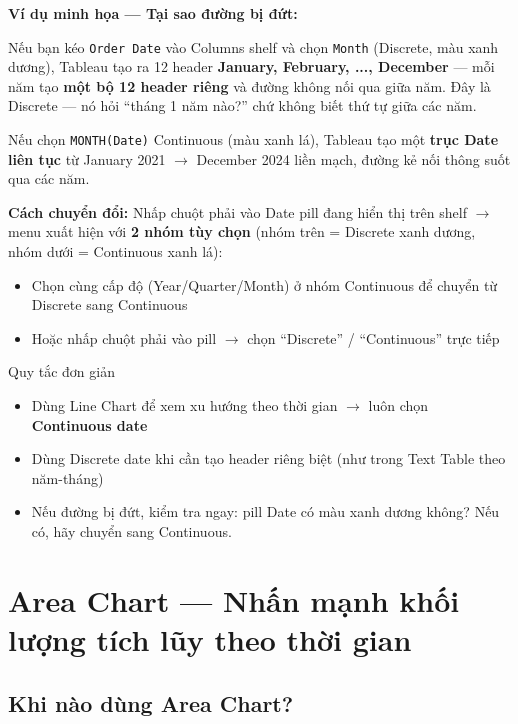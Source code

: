 \documentclass[12pt]{article}
\begin{document}
\noindent \textbf{Ví dụ minh họa --- Tại sao đường bị đứt:}

\noindent Nếu bạn kéo \texttt{Order Date} vào Columns shelf và chọn \texttt{Month} (Discrete, màu xanh dương), Tableau tạo ra 12 header \textbf{January, February, ..., December} --- mỗi năm tạo \textbf{một bộ 12 header riêng} và đường không nối qua giữa năm. Đây là Discrete --- nó hỏi ``tháng 1 năm nào?'' chứ không biết thứ tự giữa các năm.

\noindent Nếu chọn \texttt{MONTH(Date)} Continuous (màu xanh lá), Tableau tạo một \textbf{trục Date liên tục} từ January 2021 $\rightarrow$ December 2024 liền mạch, đường kẻ nối thông suốt qua các năm.

\noindent \textbf{Cách chuyển đổi:} Nhấp chuột phải vào Date pill đang hiển thị trên shelf $\rightarrow$ menu xuất hiện với \textbf{2 nhóm tùy chọn} (nhóm trên = Discrete xanh dương, nhóm dưới = Continuous xanh lá):
\begin{itemize}[nosep]
    \item Chọn cùng cấp độ (Year/Quarter/Month) ở nhóm Continuous để chuyển từ Discrete sang Continuous
    \item Hoặc nhấp chuột phải vào pill $\rightarrow$ chọn ``Discrete'' / ``Continuous'' trực tiếp
\end{itemize}

\begin{warningbox}{Quy tắc đơn giản}
\begin{itemize}[nosep]
    \item Dùng Line Chart để xem xu hướng theo thời gian $\rightarrow$ luôn chọn \textbf{Continuous date}
    \item Dùng Discrete date khi cần tạo header riêng biệt (như trong Text Table theo năm-tháng)
    \item Nếu đường bị đứt, kiểm tra ngay: pill Date có màu xanh dương không? Nếu có, hãy chuyển sang Continuous.
\end{itemize}
\end{warningbox}

\section{Area Chart --- Nhấn mạnh khối lượng tích lũy theo thời gian}

\subsection{Khi nào dùng Area Chart?}
\end{document}
